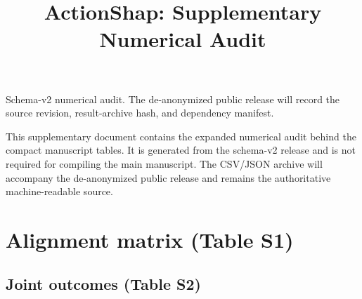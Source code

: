 \documentclass[a4paper,fleqn,doubleblind]{cas-sc}
\begin{document}
\let\WriteBookmarks\relax

\shortauthors{}

\title[mode = title]{ActionShap: Supplementary Numerical Audit}


\maketitle

\begin{center}\small Schema-v2 numerical audit. The de-anonymized public release will record the source revision, result-archive hash, and dependency manifest.\end{center}

This supplementary document contains the expanded numerical audit behind the
compact manuscript tables. It is generated from the schema-v2 release and is
not required for compiling the main manuscript. The CSV/JSON archive will
accompany the de-anonymized public release and remains the authoritative
machine-readable source.

\appendix

\renewcommand{\thesection}{S\arabic{section}}
\renewcommand{\thetable}{S\arabic{table}}
\section{Alignment matrix (Table S1)}

\clearpage
\begin{landscape}
\section{Joint outcomes (Table S2)}

\end{landscape}
\clearpage
\end{document}
